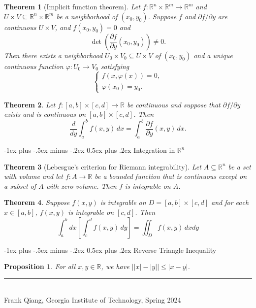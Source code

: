 \documentclass[10pt,landscape]{article}
\makeatletter
\newtheorem{theorem}{Theorem}
\newtheorem{proposition}{Proposition}
\theoremstyle{definition}
\newcommand{\R}{\mathbb{R}}
\renewcommand{\section}{\@startsection{section}{1}{0mm}%
                                {-1ex plus -.5ex minus -.2ex}%
                                {0.5ex plus .2ex}%
                                {\normalfont\large\bfseries}}
\makeatother
\begin{document}
\begin{multicols}{3}
\begin{theorem}[Implicit function theorem]
  Let $f : \R^n \times \R^m \to \R^m$ and
  $U \times V \subseteq \R^n \times \R^m$ be a
  neighborhood of $(x_0, y_0)$. Suppose $f$ and
  $\partial f / \partial y$ are continuous $U \times V$,
  and $f(x_0, y_0) = 0$ and
  \[
    \det\left(\frac{\partial f}{\partial y}(x_0, y_0)\right)
    \ne 0.
  \]
  Then there exists a neighborhood $U_0 \times V_0 \subseteq U \times V$
  of $(x_0, y_0)$ and a unique continuous function
  $\varphi : U_0 \to V_0$ satisfying
  \[
    \begin{cases}
      f(x, \varphi(x)) = 0, \\
      \varphi(x_0) = y_0.
    \end{cases}
  \]
\end{theorem}

\begin{theorem}
  Let $f : [a, b] \times [c, d] \to \R$ be continuous
  and suppose that $\partial f / \partial y$ exists
  and is continuous on $[a, b] \times [c, d]$. Then
  \[
    \frac{d}{dy} \int_a^b f(x, y)\, dx = \int_a^b \frac{\partial f}{\partial y}(x, y)\, dx.
  \]
\end{theorem}

\section{Integration in \texorpdfstring{$\R^n$}{Rn}}
\begin{theorem}[Lebesgue's criterion for Riemann integrability]
  Let $A \subseteq \R^n$ be a set with volume and
  let $f : A \to \R$ be a bounded function that is
  continuous except on a subset of $A$ with zero volume.
  Then $f$ is integrable on $A$.
\end{theorem}

\begin{theorem}
  Suppose $f(x, y)$ is integrable on
  $D = [a, b] \times [c, d]$ and for each $x \in [a, b]$,
  $f(x, y)$ is integrable on $[c, d]$. Then
  \[
    \int_a^b dx \left[\int_c^d f(x, y)\, dy\right]
    = \iint_D f(x, y)\, dxdy
  \]
\end{theorem}

\section{Reverse Triangle Inequality}
\begin{proposition}
  For all $x, y \in \R$, we have
  $\left| |x| - |y| \right| \le |x - y|$.
\end{proposition}

\vfill
\hrule
~\\
Frank Qiang, Georgia Institute of Technology, Spring 2024
\end{multicols}
\end{document}
